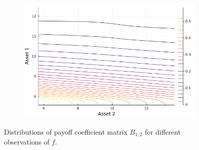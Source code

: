 \documentclass{article}
\begin{document}
\begin{figure}
\begin{subfigure}{0.4\textwidth}
    \end{subfigure}
    \begin{subfigure}{0.4\textwidth}
        \includegraphics[width=\textwidth]{../plots/params/more-corr-meanvarshift/b12.png}
    \end{subfigure}
    \caption{Distributions of payoff coefficient matrix $B_{1,2}$ for different observations of $f$.}
    \label{fig:b12}
\end{figure}
\end{document}
